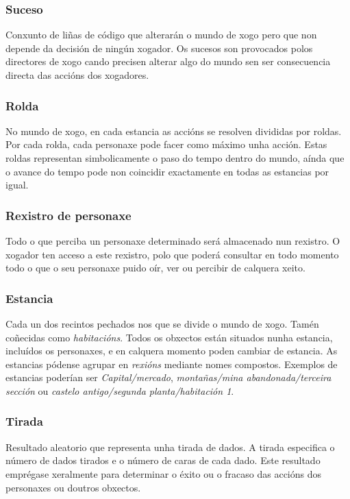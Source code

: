 \subsubsection{Suceso}
Conxunto de liñas de código que alterarán o mundo de xogo pero que non depende
da decisión de ningún xogador. Os sucesos son provocados polos directores de
xogo cando precisen alterar algo do mundo sen ser consecuencia directa das
accións dos xogadores.

\subsubsection{Rolda}
No mundo de xogo, en cada estancia as accións se resolven divididas por roldas.
Por cada rolda, cada personaxe pode facer como máximo unha acción. Estas roldas
representan simbolicamente o paso do tempo dentro do mundo, aínda que o avance
do tempo pode non coincidir exactamente en todas as estancias por igual.

\subsubsection{Rexistro de personaxe}
Todo o que perciba un personaxe determinado será almacenado nun rexistro. O
xogador ten acceso a este rexistro, polo que poderá consultar en todo momento
todo o que o seu personaxe puido oír, ver ou percibir de calquera xeito.

\subsubsection{Estancia}
Cada un dos recintos pechados nos que se divide o mundo de xogo. Tamén coñecidas
como {\it habitacións}. Todos os obxectos están situados nunha estancia,
incluídos os personaxes, e en calquera momento poden cambiar de estancia. As
estancias pódense agrupar en {\it rexións} mediante nomes compostos.
Exemplos de estancias poderían ser {\it Capital/mercado}, {\it montañas/mina
abandonada/terceira sección} ou {\it castelo antigo/segunda planta/habitación
1}.

\subsubsection{Tirada}
Resultado aleatorio que representa unha tirada de dados. A tirada especifica o
número de dados tirados e o número de caras de cada dado. Este resultado
emprégase xeralmente para determinar o éxito ou o fracaso das accións dos
personaxes ou doutros obxectos.

